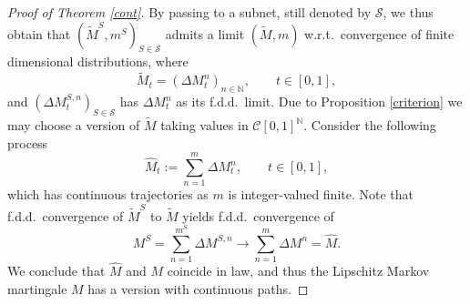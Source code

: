 \documentclass[11pt,a4paper]{article}%
\def\comment#1{\marginpar{\raggedright\scriptsize{\textcolor{purple}{#1}}}}
\numberwithin{equation}{section}
\begin{document}
\begin{proof}[Proof of Theorem \ref{cont}]
	By passing to a subnet, still denoted by $\mathcal S$, we thus obtain that $(\tilde M^S, m^S)_{S \in \mathcal S}$ admits a limit $(\tilde M,m)$ w.r.t.\ convergence of finite dimensional distributions, where
	\[ \tilde M_t = (\Delta M_t^n)_{n \in \mathbb N},\qquad t \in [0,1], \]
	and $(\Delta M_t^{S,n})_{S \in \mathcal S}$ has $\Delta M_t^n$ as its f.d.d.\ limit.
	Due to Proposition \ref{criterion} we may choose a version of $\tilde M$ taking values in $\mathcal C[0,1]^\mathbb N$.
	Consider the following process
	\[
		\hat M_t := \sum_{n = 1}^m \Delta M_t^n,	\qquad t \in [0,1],
	\]
	which has continuous trajectories as $m$ is integer-valued finite.
	Note that f.d.d.\ convergence of $\tilde M^S$ to $\tilde M$ yields f.d.d.\ convergence of
	\[
		M^S = \sum_{n = 1}^{m^S} \Delta M^{S,n} \to \sum_{n = 1}^m \Delta M^n = \hat M.
	\]
	We conclude that $\hat M$ and $M$ coincide in law, and thus the Lipschitz Markov martingale $M$ has a version with continuous paths.
\end{proof}






\end{document}
